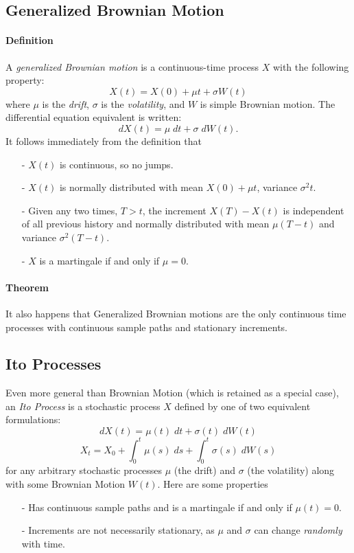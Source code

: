 \documentclass[a4paper,12pt]{scrartcl}
\begin{document}
\subsection{Generalized Brownian Motion}

\paragraph{Definition} A \emph{generalized Brownian motion} is a 
continuous-time process $X$ with the following property:
   \[ X(t) = X(0)+\mu t + \sigma W(t) \]
where $\mu$ is the \emph{drift}, $\sigma$ is the \emph{volatility},
and $W$ is simple Brownian motion. The differential equation 
equivalent is written:
   \[ dX(t) = \mu \; dt + \sigma \; dW(t).\]
It follows immediately from the definition that
\begin{itemize}
   \item[-]{$X(t)$ is continuous, so no jumps.}
   \item[-]{$X(t)$ is normally distributed with mean $X(0)+\mu t$, 
      variance $\sigma^2 t$.
      }
   \item[-]{Given any two times, $T>t$, the increment $X(T) - X(t)$ is
      independent of all previous history and normally distributed
      with mean $\mu(T-t)$ and variance $\sigma^2(T-t)$.}
   \item[-]{$X$ is a martingale if and only if $\mu = 0$.}
\end{itemize}
\paragraph{Theorem} It also happens that Generalized Brownian motions
are the only continuous time processes with continuous sample
paths and stationary increments.

\subsection{Ito Processes}

Even more general than Brownian Motion (which is retained as a special
case), an \emph{Ito Process} is 
a stochastic process $X$ defined by one of two equivalent formulations:
   \[ dX(t) = \mu(t) \; dt + \sigma(t) \; dW(t) \]
   \[ X_t = X_0 + \int^t_0 \mu(s) \; ds + \int^t_0 \sigma(s) \; dW(s)
      \]
for any arbitrary stochastic processes $\mu$ (the drift) and $\sigma$
(the volatility) along with some Brownian Motion $W(t)$.  Here are 
some properties
\begin{itemize}
   \item[-]{Has continuous sample paths and is a martingale if and only
      if $\mu(t) = 0$. }
   \item[-]{Increments are not necessarily stationary, as $\mu$ and
	 $\sigma$ can change \emph{randomly} with time.}
\end{itemize}
\end{document}
